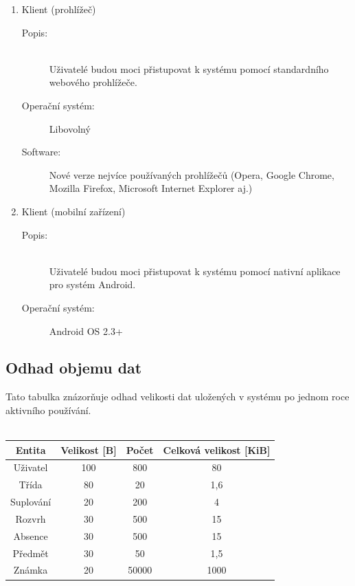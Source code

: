 \documentclass[a4paper,10pt,titlepage]{article}
\begin{document}
\begin{enumerate}
\begin{description}
			\end{description}
		\item Klient (prohlížeč)
			\begin{description}
				\item[Popis:] \hfill \\Uživatelé budou moci přistupovat k systému pomocí standardního webového prohlížeče.
				\item[Operační systém:] Libovolný
				\item[Software:] Nové verze nejvíce používaných prohlížečů (Opera, Google Chrome, Mozilla Firefox, Microsoft Internet Explorer aj.)
			\end{description}
		\item Klient (mobilní zařízení)
			\begin{description}
				\item[Popis:] \hfill \\Uživatelé budou moci přistupovat k systému pomocí nativní aplikace pro systém Android.
				\item[Operační systém:] Android OS 2.3+
			\end{description}
		\end{enumerate}
	\subsection{Odhad objemu dat}
		Tato tabulka znázorňuje odhad velikosti dat uložených v systému po jednom roce aktivního používání.
		\\\\
		\begin{tabular}{| c | c | c | c |}
			\hline
			Entita & Velikost [B] & Počet & Celková velikost [KiB] \\ \hline
			Uživatel & 100 & 800 & 80 \\ \hline
			Třída & 80 & 20 & 1,6 \\ \hline
			Suplování & 20 & 200 & 4 \\ \hline
			Rozvrh & 30 & 500 & 15 \\ \hline
			Absence & 30 & 500 & 15 \\ \hline
			Předmět & 30 & 50 & 1,5 \\ \hline
			Známka & 20 & 50000 & 1000 \\
			\hline
		\end{tabular}
		
\end{document}
